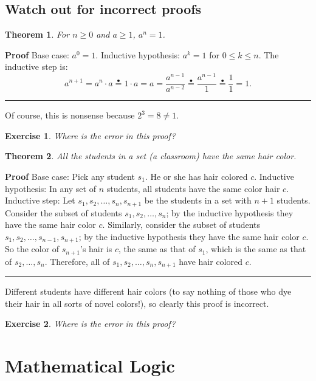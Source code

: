 \documentclass[11pt,a4paper]{report}
\newcommand*{\ih}{\stackrel{\bullet}{=}}
\newcommand*{\qed}{\hfill\rule{1ex}{1.5ex}}
\newcommand*{\qedd}[1]{\vspace*{-#1ex}\qed}
\newtheorem{theorem}{Theorem}
\newtheorem{exercise}{Exercise}
\begin{document}
\section{Watch out for incorrect proofs}

\begin{theorem}
For $n\geq 0$ and $a\geq 1$, $a^n=1$.
\end{theorem}

\textbf{Proof} Base case: $a^0=1$. Inductive hypothesis: $a^k=1$ for $0\leq k\leq n$. The inductive step is:
\[
a^{n+1}=a^n\cdot a \ih{} 1\cdot a = a = \frac{a^{n-1}}{a^{n-2}} \ih{} \frac{a^{n-1}}{1} \ih{} \frac{1}{1} = 1.
\]

\qedd{4}

\smallskip

Of course, this is nonsense because $2^3=8 \neq 1$.

\begin{exercise}
Where is the error in this proof?
\end{exercise}

\begin{theorem}
All the students in a set (a classroom) have the same hair color.
\end{theorem}

\textbf{Proof} Base case: Pick any student $s_1$. He or she has hair colored $c$. Inductive hypothesis: In any set of $n$ students, all students have the same color hair $c$. Inductive step: Let $s_1,s_2,\ldots,s_n,s_{n+1}$ be the students in a set with $n+1$ students. Consider the subset of students $s_1,s_2,\ldots,s_n$; by the inductive hypothesis they have the same hair color $c$. Similarly, consider the subset of students $s_1,s_2,\ldots,s_{n-1},s_{n+1}$; by the inductive hypothesis they have the same hair color $c$. So the color of $s_{n+1}$'s hair is $c$, the same as that of $s_1$, which is the same as that of $s_2,\ldots,s_n$. Therefore, all of $s_1,s_2,\ldots,s_n,s_{n+1}$ have hair colored $c$.\qed

Different students have different hair colors (to say nothing of those who dye their hair in all sorts of novel colors!), so clearly this proof is incorrect.

\begin{exercise}
Where is the error in this proof?
\end{exercise}


\chapter{Mathematical Logic}\label{s.logic}
\end{document}
